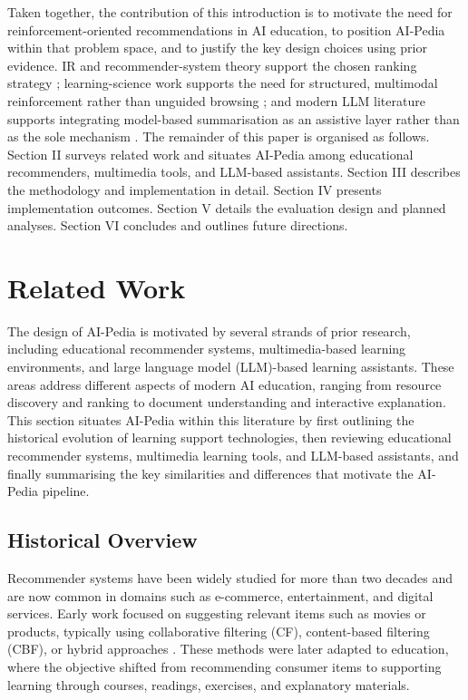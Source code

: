 \documentclass[10pt,journal,compsoc]{IEEEtran}
\begin{document}
Taken together, the contribution of this introduction is to motivate the need for reinforcement-oriented recommendations in AI education, to position AI-Pedia within that problem space, and to justify the key design choices using prior evidence. IR and recommender-system theory support the chosen ranking strategy \cite{manning2008,pazzani2007,ricci2011}; learning-science work supports the need for structured, multimodal reinforcement rather than unguided browsing \cite{sweller1988,mayer2009}; and modern LLM literature supports integrating model-based summarisation as an assistive layer rather than as the sole mechanism \cite{vaswani2017,bommasani2021}. The remainder of this paper is organised as follows. Section II surveys related work and situates AI-Pedia among educational recommenders, multimedia tools, and LLM-based assistants. Section III describes the methodology and implementation in detail. Section IV presents implementation outcomes. Section V details the evaluation design and planned analyses. Section VI concludes and outlines future directions.

\section{Related Work}

The design of AI-Pedia is motivated by several strands of prior research, including educational recommender systems, multimedia-based learning environments, and large language model (LLM)-based learning assistants. These areas address different aspects of modern AI education, ranging from resource discovery and ranking to document understanding and interactive explanation. This section situates AI-Pedia within this literature by first outlining the historical evolution of learning support technologies, then reviewing educational recommender systems, multimedia learning tools, and LLM-based assistants, and finally summarising the key similarities and differences that motivate the AI-Pedia pipeline.

\subsection{Historical Overview}

Recommender systems have been widely studied for more than two decades and are now common in domains such as e-commerce, entertainment, and digital services. Early work focused on suggesting relevant items such as movies or products, typically using collaborative filtering (CF), content-based filtering (CBF), or hybrid approaches \cite{adomavicius2005toward, ricci2011}. These methods were later adapted to education, where the objective shifted from recommending consumer items to supporting learning through courses, readings, exercises, and explanatory materials.
\end{document}
